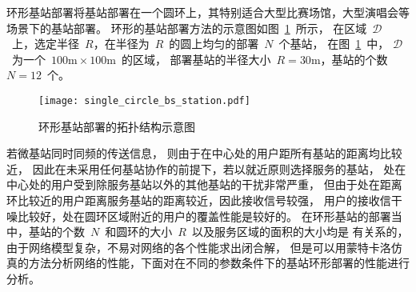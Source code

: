 
环形基站部署将基站部署在一个圆环上，其特别适合大型比赛场馆，大型演唱会等场景下的基站部署。
环形的基站部署方法的示意图如图~\ref{single_circle_bs_show}~所示，
在区域~$\mathcal{D}$~上，选定半径~$R$，在半径为~$R$~的圆上均匀的部署~$N$~个基站，
在图~\ref{single_circle_bs_show}~中，
$\mathcal{D}$~为一个~$100\mathrm{m}\times 100 \mathrm{m}$~的区域，
部署基站的半径大小~$R=30\mathrm{m}$，基站的个数~$N=12$~个。
\begin{figure}[htbp]
\centering
\texttt{[image: single\_circle\_bs\_station.pdf]}
\caption{环形基站部署的拓扑结构示意图}\vspace{-0.5em}
\label{single_circle_bs_show}
\end{figure}
若微基站同时同频的传送信息，
则由于在中心处的用户距所有基站的距离均比较近，
因此在未采用任何基站协作的前提下，若以就近原则选择服务的基站，
处在中心处的用户受到除服务基站以外的其他基站的干扰非常严重，
但由于处在距离环比较近的用户距离服务基站的距离较近，因此接收信号较强，
用户的接收信干噪比较好，处在圆环区域附近的用户的覆盖性能是较好的。
在环形基站的部署当中，基站的个数~$N$~和圆环的大小~$R$~以及服务区域的面积的大小均是
有关系的，由于网络模型复杂，不易对网络的各个性能求出闭合解，
但是可以用蒙特卡洛仿真的方法分析网络的性能，下面对在不同的参数条件下的基站环形部署的性能进行分析。

